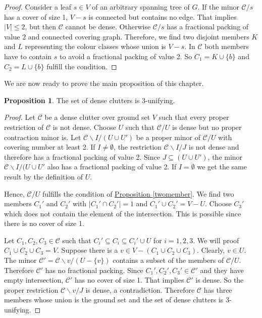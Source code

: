 \documentclass[a4paper, 12pt, twoside=false]{scrbook}
\theoremstyle{definition}
\newtheorem{proposition}[theorem]{Proposition}
\begin{document}
\begin{proof}
       Consider a leaf $s \in V$ of an arbitrary spanning tree of $G$.
       If the minor $\mathcal{C} / s$ has a cover of size 1, $V - s$ is connected but contains no edge.
       That implies $|V| \leq 2$, but then $\mathcal{C}$ cannot be dense.
       Otherwise $\mathcal{C} / s$ has a fractional packing of value 2 and connected covering graph.
       Therefore, we find two disjoint members $K$ and $L$ representing the colour classes whose union is $V-s$.
       In $\mathcal{C}$ both members have to contain $s$ to avoid a fractional packing of value 2.
       So $C_1=K\cup \{b\}$ and $C_2=L\cup \{b\}$ fulfill the condition.
   \end{proof}

   We are now ready to prove the main proposition of this chapter.
   \begin{proposition}
       The set of dense clutters is 3-unifying.
   \end{proposition}

   \begin{proof}
       Let $\mathcal{C}$ be a dense clutter over ground set $V$ such that every proper restriction of $\mathcal{C}$ is not dense.
       Choose $U$ such that $\mathcal{C} / U$ is dense but no proper contraction minor is.
       Let $\mathcal{C} \backslash I / (U \cup U')$ be a proper minor of $\mathcal{C} /U$ with covering number at least 2.
       If $I \neq \emptyset$, the restriction $\mathcal{C} \backslash I / J$ is not dense and therefore has a fractional packing of value 2.
       Since $J \subseteq (U \cup U')$, the minor $\mathcal{C} \backslash I / (U \cup U'$ also has a fractional packing of value 2.
       If $I=\emptyset$ we get the same result by the definition of $U$.

       Hence, $\mathcal{C}/U$ fulfills the condition of \hyperref[twomember]{Proposition \ref*{twomember}}.
       We find two members $C_1'$ and $C_2'$ with $|C_1' \cap C_2'| = 1$ and $C_1' \cup C_2' = V - U$.
       Choose $C_3'$ which does not contain the element of the intersection.
       This is possible since there is no cover of size 1.

       Let $C_1, C_2, C_3 \in \mathcal{C}$ such that $C_i' \subseteq C_i \subseteq C_i' \cup U$ for $i=1,2,3$.
       We will proof $C_1 \cup C_2 \cup C_3 = V$.
       Suppose there is a $v \in V-(C_1 \cup C_2 \cup C_3)$.
       Clearly, $v \in U$.
       The minor $\mathcal{C'} = \mathcal{C} \backslash v / (U-\{v\})$ contains a subset of the members of $\mathcal{C}/U$.
       Therefore $\mathcal{C'}$ has no fractional packing.
       Since $C_1', C_2', C_3' \in \mathcal{C'}$ and they have empty intersection, $\mathcal{C'}$ has no cover of size 1.
       That implies $\mathcal{C'}$ is dense.
       So the proper restriction $\mathcal{C}\backslash v / J$ is dense, a contradiction.
       Therefore $\mathcal{C}$ has three members whose union is the ground set and the set of dense clutters is 3-unifying.
   \end{proof}

   \printbibliography[title={References}]
   \printindex
\end{document}
